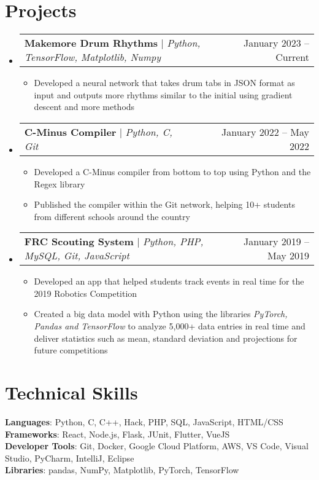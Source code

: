 \documentclass[letterpaper,11pt]{article}
\makeatletter
\newcommand{\resumeItem}[1]{
  \item\small{
    {#1 \vspace{-2pt}}
  }
}
\newcommand{\resumeProjectHeading}[2]{
    \item
    \begin{tabular*}{0.97\textwidth}{l@{\extracolsep{\fill}}r}
      \small#1 & #2 \\
    \end{tabular*}\vspace{-7pt}
}
\newcommand{\resumeSubHeadingListStart}{\begin{itemize}[leftmargin=0.15in, label={}]}
\newcommand{\resumeSubHeadingListEnd}{\end{itemize}}
\newcommand{\resumeItemListStart}{\begin{itemize}}
\newcommand{\resumeItemListEnd}{\end{itemize}\vspace{-5pt}}
\makeatother
\begin{document}
\section{Projects}
    \resumeSubHeadingListStart
      \resumeProjectHeading
          {\textbf{Makemore Drum Rhythms} $|$ \emph{Python, TensorFlow, Matplotlib, Numpy}}{January 2023 -- Current}
          \resumeItemListStart
            \resumeItem{Developed a neural network that takes drum tabs in JSON format as input and outputs more rhythms similar to the initial using gradient descent and more methods}
          \resumeItemListEnd
      \resumeProjectHeading
          {\textbf{C-Minus Compiler} $|$ \emph{Python, C, Git}}{January 2022 -- May 2022}
          \resumeItemListStart
            \resumeItem{Developed a C-Minus compiler from bottom to top using Python and the Regex library}
            \resumeItem{Published the compiler within the Git network, helping 10+ students from different schools around the country}
          \resumeItemListEnd
      \resumeProjectHeading
          {\textbf{FRC Scouting System} $|$ \emph{Python, PHP, MySQL, Git, JavaScript}}{January 2019 -- May 2019}
          \resumeItemListStart
            \resumeItem{Developed an app that helped students track events in real time for the 2019 Robotics Competition}
            \resumeItem{Created a big data model with Python using the libraries \emph{PyTorch, Pandas and TensorFlow} to analyze 5,000+ data entries in real time and deliver statistics such as mean, standard deviation and projections for future competitions}
          \resumeItemListEnd
    \resumeSubHeadingListEnd


%
\section{Technical Skills}
 \begin{itemize}[leftmargin=0.15in, label={}]
    \small{\item{
     \textbf{Languages}{: Python, C, C++, Hack, PHP, SQL, JavaScript, HTML/CSS} \\
     \textbf{Frameworks}{: React, Node.js, Flask, JUnit, Flutter, VueJS} \\
     \textbf{Developer Tools}{: Git, Docker, Google Cloud Platform, AWS, VS Code, Visual Studio, PyCharm, IntelliJ, Eclipse} \\
     \textbf{Libraries}{: pandas, NumPy, Matplotlib, PyTorch, TensorFlow}
    }}
 \end{itemize}


\end{document}
